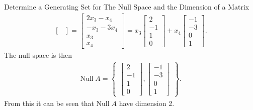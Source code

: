 \begin{example}{Determine a Generating Set for The Null Space and the Dimension of a Matrix }
\begin{align*}
\begin{bmatrix}
\end{bmatrix} =
\begin{bmatrix}
   2x_3 - x_4 \\ -x_3 -3x_4 \\ x_3 \\ x_4
\end{bmatrix} = x_3
\begin{bmatrix}
   2\\ -1\\ 1 \\0
\end{bmatrix} + x_4
\begin{bmatrix}
   -1\\ -3\\ 0\\ 1
\end{bmatrix}.
\end{align*}
The null space is then
\begin{align*}
\text{Null}\; A = 
\begin{Bmatrix}
\begin{bmatrix}
   2\\ -1\\ 1 \\0
\end{bmatrix},
\begin{bmatrix}
   -1\\ -3\\ 0\\ 1
\end{bmatrix}
\end{Bmatrix}.
\end{align*}
From this it can be seen that $\text{Null}\; A$ have dimension 2.
\end{example}

